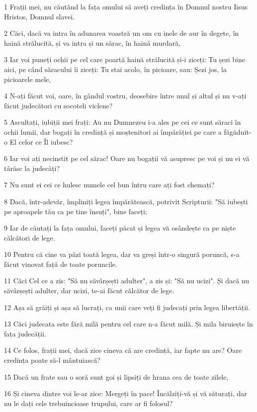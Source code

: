\par 1 Frații mei, nu căutând la fața omului să aveți credința în Domnul nostru Iisus Hristos, Domnul slavei.
\par 2 Căci, dacă va intra în adunarea voastră un om cu inele de aur în degete, în haină strălucită, și va intra și un sărac, în haină murdară,
\par 3 Iar voi puneți ochii pe cel care poartă haină strălucită și-i ziceți: Tu șezi bine aici, pe când săracului îi ziceți: Tu stai acolo, în picioare, sau: Șezi jos, la picioarele mele,
\par 4 N-ați făcut voi, oare, în gândul vostru, deosebire între unul și altul și nu v-ați făcut judecători cu socoteli viclene?
\par 5 Ascultați, iubiții mei frați: Au nu Dumnezeu i-a ales pe cei ce sunt săraci în ochii lumii, dar bogați în credință și moștenitori ai împărăției pe care a făgăduit-o El celor ce Îl iubesc?
\par 6 Iar voi ați necinstit pe cel sărac! Oare nu bogații vă asupresc pe voi și nu ei vă târăsc la judecăți?
\par 7 Nu sunt ei cei ce hulesc numele cel bun întru care ați fost chemați?
\par 8 Dacă, într-adevăr, împliniți legea împărătească, potrivit Scripturii: "Să iubești pe aproapele tău ca pe tine însuți", bine faceți;
\par 9 Iar de căutați la fața omului, faceți păcat și legea vă osândește ca pe niște călcători de lege.
\par 10 Pentru că cine va păzi toată legea, dar va greși într-o singură poruncă, s-a făcut vinovat față de toate poruncile.
\par 11 Căci Cel ce a zis: "Să nu săvârșești adulter", a zis și: "Să nu ucizi". Și dacă nu săvârșești adulter, dar ucizi, te-ai făcut călcător de lege.
\par 12 Așa să grăiți și așa să lucrați, ca unii care veți fi judecați prin legea libertății.
\par 13 Căci judecata este fără milă pentru cel care n-a făcut milă. Și mila biruiește în fața judecății.
\par 14 Ce folos, frații mei, dacă zice cineva că are credință, iar fapte nu are? Oare credința poate să-l mântuiască?
\par 15 Dacă un frate sau o soră sunt goi și lipsiți de hrana cea de toate zilele,
\par 16 Și cineva dintre voi le-ar zice: Mergeți în pace! Încălziți-vă și vă săturați, dar nu le dați cele trebuincioase trupului, care ar fi folosul?
